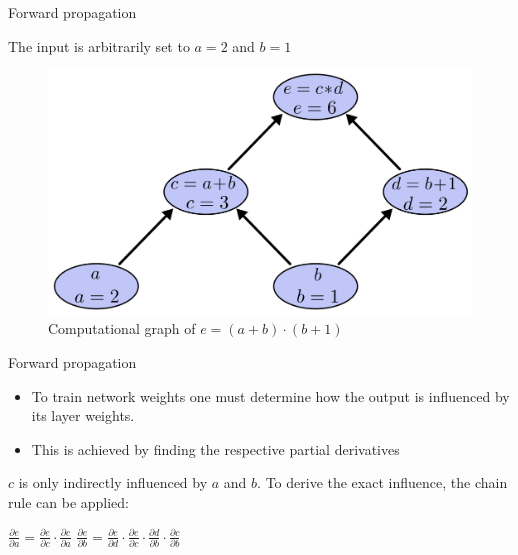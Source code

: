 \documentclass[12pt]{beamer}
\begin{document}
\begin{frame}{Forward propagation}

The input is arbitrarily set to $a = 2$ and $b = 1$

\begin{figure}
\centering
\includegraphics[width = 0.6\linewidth]{images/backprop2.png}
\caption{Computational graph of $e = (a+b)\cdot (b+1)$}

\label{fig:propagation}
\end{figure}
\end{frame}
\begin{frame}{Forward propagation}
\begin{itemize}
\item 
To train network weights one must determine how the output is influenced by its layer weights.
\item
This is achieved by finding the respective partial derivatives
\end{itemize}

\bigbreak

$c$ is only indirectly influenced by $a$ and $b$. To derive the exact influence, the chain rule can be applied:\newline

\large$\frac{\partial{e}}{\partial{a}} = \frac{\partial{e}}{\partial{c}} \cdot \frac{\partial{c}}{\partial{a}}$
\newline \newline
\large$\frac{\partial{e}}{\partial{b}} = \frac{\partial{e}}{\partial{d}} \cdot \frac{\partial{e}}{\partial{c}} \cdot \frac{\partial{d}}{\partial{b}} \cdot \frac{\partial{c}}{\partial{b}}$



\end{frame}
\end{document}
